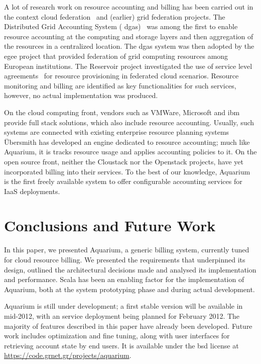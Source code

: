 \documentclass[preprint,10pt]{sigplanconf}
\begin{document}
A lot of research work on resource accounting and billing has been carried out
in the context cloud federation~\cite{Rochw09, Elmro09} and (earlier) grid
federation projects. The Distributed Grid Accounting System ({\sc
dgas})~\cite{Piro06} was among the first to enable resource accounting at the
computing and storage layers and then aggregation of the resources in a
centralized location. The {\sc dgas} system was then adopted by the {\sc egee}
project that provided federation of grid computing resources among European
institutions. The Reservoir project investigated the use of service level
agreements~\cite{Elmro09} for resource provisioning in federated cloud
scenarios. Resource monitoring and billing are identified as key
functionalities for such services, however, no actual implementation was
produced.

On the cloud computing front, vendors such as VMWare, Microsoft and {\sc ibm}
provide full stack solutions, which also include resource accounting. Usually,
such systems are connected with existing enterprise resource planning systems
\"Ubersmith has developed an engine dedicated to resource accounting; much like
Aquarium, it is tracks resource usage and applies accounting policies to it.
On the open source front, neither the Cloustack nor the Openstack projects,
have yet incorporated billing into their services. To the best of our
knowledge, Aquarium is the first freely available system to offer configurable
accounting services for IaaS deployments.

\section{Conclusions and Future Work}

In this paper, we presented Aquarium, a generic billing system, currently tuned
for cloud resource billing. We presented the requirements that underpinned its
design, outlined the architectural decisions made and analysed its
implementation and performance.
Scala has been an enabling factor for the
implementation of Aquarium, both at the system prototyping phase and during
actual development.  

Aquarium is still under development; a first stable version will be available
in mid-2012, with an service deployment being planned for February 2012. 
The majority of features described in this paper have already been developed.
Future work includes optimization and fine tuning, along with user interfaces
for retrieving account state by end users.
It is available under the {\sc bsd} license at 
\url{https://code.grnet.gr/projects/aquarium}.



\end{document}
